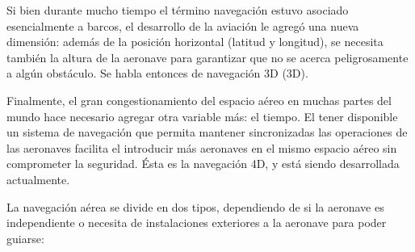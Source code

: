 \documentclass[a4paper,12pt,twoside]{article}
\begin{document}
\vspace{3mm}


Si bien durante mucho tiempo el t\'ermino navegaci\'on estuvo asociado esencialmente a barcos, el desarrollo de la aviaci\'on le agreg\'o una nueva dimensi\'on: adem\'as de la posici\'on horizontal (\gls{latitud} y \gls{longitud}), se necesita tambi\'en la altura de la aeronave para garantizar que no se acerca peligrosamente a alg\'un obst\'aculo. Se habla entonces de navegaci\'on 3D (\ac{3D}).

Finalmente, el gran congestionamiento del espacio a\'ereo en muchas partes del mundo hace necesario agregar otra variable m\'as: el tiempo. El tener disponible un sistema de navegaci\'on que permita mantener sincronizadas las operaciones de las aeronaves facilita el introducir m\'as aeronaves en el mismo espacio a\'ereo sin comprometer la seguridad. \'Esta es la navegaci\'on 4D, y est\'a siendo desarrollada actualmente. 

La navegaci\'on a\'erea se divide en dos tipos, dependiendo de si la aeronave es independiente o necesita de instalaciones exteriores a la aeronave para poder guiarse:




\end{document}
